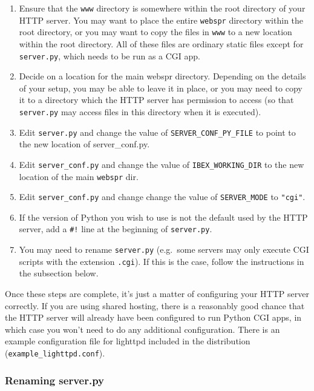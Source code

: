 \documentclass[]{article}
\begin{document}
\begin{enumerate}
\item
  Ensure that the \texttt{www} directory is somewhere within the root
  directory of your HTTP server. You may want to place the entire
  \texttt{webspr} directory within the root directory, or you may want
  to copy the files in \texttt{www} to a new location within the root
  directory. All of these files are ordinary static files except for
  \texttt{server.py}, which needs to be run as a CGI app.
\item
  Decide on a location for the main webspr directory. Depending on the
  details of your setup, you may be able to leave it in place, or you
  may need to copy it to a directory which the HTTP server has
  permission to access (so that \texttt{server.py} may access files in
  this directory when it is executed).
\item
  Edit \texttt{server.py} and change the value of
  \texttt{SERVER\_CONF\_PY\_FILE} to point to the new location of
  server\_conf.py.
\item
  Edit \texttt{server\_conf.py} and change the value of
  \texttt{IBEX\_WORKING\_DIR} to the new location of the main
  \texttt{webspr} dir.
\item
  Edit \texttt{server\_conf.py} and change change the value of
  \texttt{SERVER\_MODE} to \texttt{"cgi"}.
\item
  If the version of Python you wish to use is not the default used by
  the HTTP server, add a \texttt{\#!} line at the beginning of
  \texttt{server.py}.
\item
  You may need to rename \texttt{server.py} (e.g.~some servers may only
  execute CGI scripts with the extension \texttt{.cgi}). If this is the
  case, follow the instructions in the subsection below.
\end{enumerate}

Once these steps are complete, it's just a matter of configuring your
HTTP server correctly. If you are using shared hosting, there is a
reasonably good chance that the HTTP server will already have been
configured to run Python CGI apps, in which case you won't need to do
any additional configuration. There is an example configuration file for
lighttpd included in the distribution (\texttt{example\_lighttpd.conf}).

\subsubsection{Renaming server.py}\label{renaming-server.py}
\end{document}
